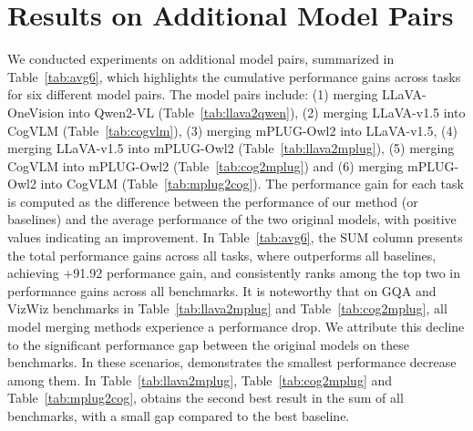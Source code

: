 \clearpage
\appendix


\section{Results on Additional Model Pairs}
\label{appendix:additional}

We conducted experiments on additional model pairs, summarized in Table~\ref{tab:avg6}, which highlights the cumulative performance gains across tasks for six different model pairs. The model pairs include: (1) merging LLaVA-OneVision \cite{llava-onevison} into Qwen2-VL \cite{qwen2-vl} (Table~\ref{tab:llava2qwen}), (2) merging LLaVA-v1.5 \cite{llava1.5} into CogVLM \cite{cogvlm} (Table~\ref{tab:cogvlm}), (3) merging mPLUG-Owl2 into LLaVA-v1.5, (4) merging LLaVA-v1.5 into mPLUG-Owl2 \cite{mplugowl2} (Table~\ref{tab:llava2mplug}), (5) merging CogVLM into mPLUG-Owl2 (Table~\ref{tab:cog2mplug}) and (6) merging mPLUG-Owl2 into CogVLM (Table~\ref{tab:mplug2cog}).
The performance gain for each task is computed as the difference between the performance of our method (or baselines) and the average performance of the two original models, with positive values indicating an improvement.
In Table~\ref{tab:avg6}, the SUM column presents the total performance gains across all tasks, where \ours outperforms all baselines, achieving +91.92 performance gain, and consistently ranks among the top two in performance gains across all benchmarks.
It is noteworthy that on GQA \cite{gqa} and VizWiz \cite{vizwiz} benchmarks in Table~\ref{tab:llava2mplug} and Table~\ref{tab:cog2mplug}, all model merging methods experience a performance drop. We attribute this decline to the significant performance gap between the original models on these benchmarks. In these scenarios, \ours demonstrates the smallest performance decrease among them.
In Table~\ref{tab:llava2mplug}, Table~\ref{tab:cog2mplug} and Table~\ref{tab:mplug2cog}, \ours obtains the second best result in the sum of all benchmarks, with a small gap compared to the best baseline. 

